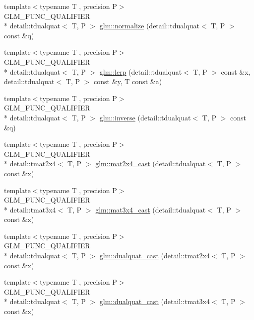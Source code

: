 \begin{DoxyCompactItemize}
\item 
{\footnotesize template$<$typename T , precision P$>$ }\\G\-L\-M\-\_\-\-F\-U\-N\-C\-\_\-\-Q\-U\-A\-L\-I\-F\-I\-E\-R \\*
detail\-::tdualquat$<$ T, P $>$ \hyperlink{group__gtc__dual__quaternion_ga4364d115fe8ee2f65ff047726133d0ad}{glm\-::normalize} (detail\-::tdualquat$<$ T, P $>$ const \&q)
\item 
{\footnotesize template$<$typename T , precision P$>$ }\\G\-L\-M\-\_\-\-F\-U\-N\-C\-\_\-\-Q\-U\-A\-L\-I\-F\-I\-E\-R \\*
detail\-::tdualquat$<$ T, P $>$ \hyperlink{group__gtc__dual__quaternion_ga28cbcf029272d5351d4695b8610de126}{glm\-::lerp} (detail\-::tdualquat$<$ T, P $>$ const \&x, detail\-::tdualquat$<$ T, P $>$ const \&y, T const \&a)
\item 
{\footnotesize template$<$typename T , precision P$>$ }\\G\-L\-M\-\_\-\-F\-U\-N\-C\-\_\-\-Q\-U\-A\-L\-I\-F\-I\-E\-R \\*
detail\-::tdualquat$<$ T, P $>$ \hyperlink{group__gtc__dual__quaternion_gaad6b9faeb1134c04defae01426a777f8}{glm\-::inverse} (detail\-::tdualquat$<$ T, P $>$ const \&q)
\item 
{\footnotesize template$<$typename T , precision P$>$ }\\G\-L\-M\-\_\-\-F\-U\-N\-C\-\_\-\-Q\-U\-A\-L\-I\-F\-I\-E\-R \\*
detail\-::tmat2x4$<$ T, P $>$ \hyperlink{group__gtc__dual__quaternion_gade155fb0dfc144259a25897776e73325}{glm\-::mat2x4\-\_\-cast} (detail\-::tdualquat$<$ T, P $>$ const \&x)
\item 
{\footnotesize template$<$typename T , precision P$>$ }\\G\-L\-M\-\_\-\-F\-U\-N\-C\-\_\-\-Q\-U\-A\-L\-I\-F\-I\-E\-R \\*
detail\-::tmat3x4$<$ T, P $>$ \hyperlink{group__gtc__dual__quaternion_ga2f4f0a1275fa95c272dd6ad6df75013d}{glm\-::mat3x4\-\_\-cast} (detail\-::tdualquat$<$ T, P $>$ const \&x)
\item 
{\footnotesize template$<$typename T , precision P$>$ }\\G\-L\-M\-\_\-\-F\-U\-N\-C\-\_\-\-Q\-U\-A\-L\-I\-F\-I\-E\-R \\*
detail\-::tdualquat$<$ T, P $>$ \hyperlink{group__gtc__dual__quaternion_gad47c752ec23a5f9924e7d7f84c40f3e5}{glm\-::dualquat\-\_\-cast} (detail\-::tmat2x4$<$ T, P $>$ const \&x)
\item 
{\footnotesize template$<$typename T , precision P$>$ }\\G\-L\-M\-\_\-\-F\-U\-N\-C\-\_\-\-Q\-U\-A\-L\-I\-F\-I\-E\-R \\*
detail\-::tdualquat$<$ T, P $>$ \hyperlink{group__gtc__dual__quaternion_ga97c4fb8941ad1954e01578cca8182180}{glm\-::dualquat\-\_\-cast} (detail\-::tmat3x4$<$ T, P $>$ const \&x)
\end{DoxyCompactItemize}


